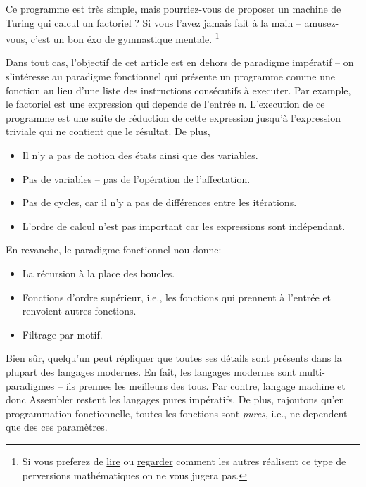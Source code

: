 Ce programme est très simple, mais pourriez-vous de proposer un machine de Turing qui calcul un factoriel ?
Si vous l'avez jamais fait à la main -- amusez-vous, c'est un bon éxo de gymnastique mentale.
\footnote{Si vous preferez de \href{https://math.stackexchange.com/questions/1153376/construct-a-turing-machine-for-factorialunary}{lire} ou \href{https://youtu.be/h77-wb44Uvg}{regarder} comment les autres réalisent ce type de perversions mathématiques on ne vous jugera pas.}

Dans tout cas, l'objectif de cet article est en dehors de paradigme impératif -- on s'intéresse au paradigme fonctionnel qui présente un programme comme une fonction au lieu d'une liste des instructions consécutifs à executer.
Par example, le factoriel est une expression qui depende de l'entrée \verb|n|.
L'execution de ce programme est une suite de réduction de cette expression jusqu'à l'expression triviale qui ne contient que le résultat.
De plus,
\begin{itemize}
	\item Il n'y a pas de notion des états ainsi que des variables.
	\item Pas de variables -- pas de l'opération de l'affectation.
	\item Pas de cycles, car il n'y a pas de différences entre les itérations.
	\item L'ordre de calcul n'est pas important car les expressions sont indépendant.
\end{itemize}
En revanche, le paradigme fonctionnel nou donne:
\begin{itemize}
	\item La récursion à la place des boucles.
	\item Fonctions d'ordre supérieur, i.e., les fonctions qui prennent à l'entrée et renvoient autres fonctions.
	\item Filtrage par motif.
\end{itemize}
Bien sûr, quelqu'un peut répliquer que toutes ses détails sont présents dans la plupart des langages modernes.
En fait, les langages modernes sont multi-paradigmes -- ils prennes les meilleurs des tous.
Par contre, langage machine et donc Assembler restent les langages pures impératifs.
De plus, rajoutons qu'en programmation fonctionnelle, toutes les fonctions sont \emph{pures}, i.e., ne dependent que des ces paramètres.


